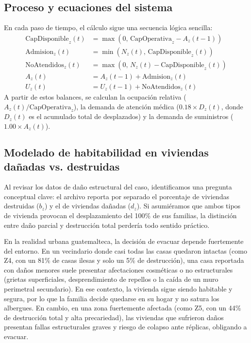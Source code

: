 \documentclass[10pt,letterpaper]{article}
\begin{document}
\subsection{Proceso y ecuaciones del sistema}
En cada paso de tiempo, el cálculo sigue una secuencia lógica sencilla:
\begin{align}
    \text{CapDisponible}_z(t) &= \max\left(0, \, \text{CapOperativa}_z - A_z(t-1)\right) \\
    \text{Admision}_z(t) &= \min\left(N_z(t), \, \text{CapDisponible}_z(t)\right) \\
    \text{NoAtendidos}_z(t) &= \max\left(0, \, N_z(t) - \text{CapDisponible}_z(t)\right) \\
    A_z(t) &= A_z(t-1) + \text{Admision}_z(t) \\
    U_z(t) &= U_z(t-1) + \text{NoAtendidos}_z(t)
\end{align}
A partir de estos balances, se calculan la ocupación relativa ($A_z(t)/\text{CapOperativa}_z$), la demanda de atención médica ($0.18 \times D_z(t)$, donde $D_z(t)$ es el acumulado total de desplazados) y la demanda de suministros ($1.00 \times A_z(t)$).

\subsection{Modelado de habitabilidad en viviendas dañadas vs. destruidas}
Al revisar los datos de daño estructural del caso, identificamos una pregunta conceptual clave: el archivo reporta por separado el porcentaje de viviendas destruidas ($b_z$) y el de viviendas dañadas ($d_z$). Si asumiéramos que ambos tipos de vivienda provocan el desplazamiento del 100\% de sus familias, la distinción entre daño parcial y destrucción total perdería todo sentido práctico.

En la realidad urbana guatemalteca, la decisión de evacuar depende fuertemente del entorno. En un vecindario donde casi todas las casas quedaron intactas (como Z4, con un 81\% de casas ilesas y solo un 5\% de destrucción), una casa reportada con daños menores suele presentar afectaciones cosméticas o no estructurales (grietas superficiales, desprendimiento de repellos o la caída de un muro perimetral secundario). En ese contexto, la vivienda sigue siendo habitable y segura, por lo que la familia decide quedarse en su hogar y no satura los albergues. En cambio, en una zona fuertemente afectada (como Z5, con un 44\% de destrucción total y alta precariedad), las viviendas que sufrieron daños presentan fallas estructurales graves y riesgo de colapso ante réplicas, obligando a evacuar.
\end{document}

